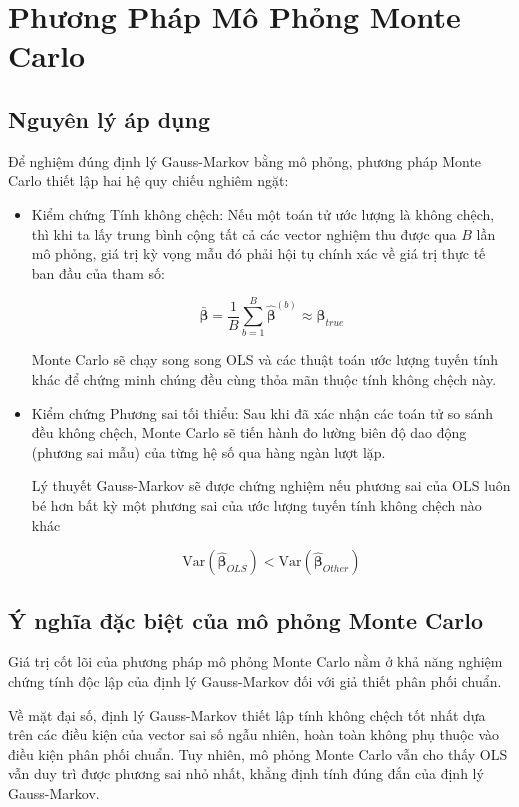 \section{Phương Pháp Mô Phỏng Monte Carlo}

\subsection{Nguyên lý áp dụng}

Để nghiệm đúng định lý Gauss-Markov bằng mô phỏng, phương pháp Monte Carlo thiết lập hai hệ quy chiếu nghiêm ngặt:

\begin{itemize}[topsep=0pt, itemsep=2.5pt, leftmargin=1.5cm]
    \item Kiểm chứng Tính không chệch: Nếu một toán tử ước lượng là không chệch, thì khi ta lấy trung bình cộng tất cả các vector nghiệm thu được qua $B$ lần mô phỏng, giá trị kỳ vọng mẫu đó phải hội tụ chính xác về giá trị thực tế ban đầu của tham số:

    $$\bar{\boldsymbol{\beta}} = \frac{1}{B} \sum_{b=1}^{B} \hat{\boldsymbol{\beta}}^{(b)} \approx \boldsymbol{\beta}_{true}$$

    Monte Carlo sẽ chạy song song OLS và các thuật toán ước lượng tuyến tính khác để chứng minh chúng đều cùng thỏa mãn thuộc tính không chệch này.

    \item Kiểm chứng Phương sai tối thiểu: Sau khi đã xác nhận các toán tử so sánh đều không chệch, Monte Carlo sẽ tiến hành đo lường biên độ dao động (phương sai mẫu) của từng hệ số qua hàng ngàn lượt lặp.

    Lý thuyết Gauss-Markov sẽ được chứng nghiệm nếu phương sai của OLS luôn bé hơn bất kỳ một phương sai của ước lượng tuyến tính không chệch nào khác

    $$\text{Var}(\hat{\boldsymbol{\beta}}_{OLS}) < \text{Var}(\hat{\boldsymbol{\beta}}_{Other})$$
\end{itemize}

\subsection{Ý nghĩa đặc biệt của mô phỏng Monte Carlo}

Giá trị cốt lõi của phương pháp mô phỏng Monte Carlo nằm ở khả năng nghiệm chứng tính độc lập của định lý Gauss-Markov đối với giả thiết phân phối chuẩn.

Về mặt đại số, định lý Gauss-Markov thiết lập tính không chệch tốt nhất dựa trên các điều kiện của vector sai số ngẫu nhiên, hoàn toàn không phụ thuộc vào điều kiện phân phối chuẩn. Tuy nhiên, mô phỏng Monte Carlo vẫn cho thấy OLS vẫn duy trì được phương sai nhỏ nhất, khẳng định tính đúng đắn của định lý Gauss-Markov.

